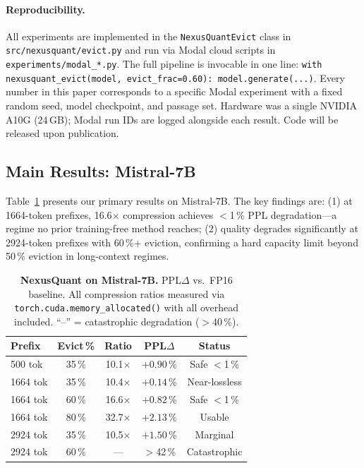 \documentclass{article}
\begin{document}
\paragraph{Reproducibility.}
All experiments are implemented in the \texttt{NexusQuantEvict} class
in \texttt{src/nexusquant/evict.py} and run via Modal cloud scripts in
\texttt{experiments/modal\_*.py}. The full pipeline is invocable in one
line: \texttt{with nexusquant\_evict(model, evict\_frac=0.60): model.generate(...)}.
Every number in this paper corresponds to a specific Modal experiment with
a fixed random seed, model checkpoint, and passage set. Hardware was a
single NVIDIA A10G (24\,GB); Modal run IDs are logged alongside each
result. Code will be released upon publication.

\subsection{Main Results: Mistral-7B}
\label{sec:main_results}

Table~\ref{tab:main_mistral} presents our primary results on Mistral-7B.
The key findings are: (1) at 1664-token prefixes, 16.6$\times$ compression
achieves $<$1\,\% PPL degradation---a regime no prior training-free method
reaches; (2) quality degrades significantly at 2924-token prefixes with
60\,\%+ eviction, confirming a hard capacity limit beyond 50\,\% eviction
in long-context regimes.

\begin{table}[t]
\centering
\caption{\textbf{NexusQuant on Mistral-7B.} PPL$\Delta$ vs.\ FP16 baseline.
  All compression ratios measured via \texttt{torch.cuda.memory\_allocated()}
  with all overhead included. ``--'' = catastrophic degradation ($>$40\,\%).}
\label{tab:main_mistral}
\begin{tabular}{@{}lcccc@{}}
\toprule
Prefix & Evict\,\% & Ratio & PPL$\Delta$ & Status \\
\midrule
500 tok  & 35\,\% & 10.1$\times$ & $+0.90$\,\% & Safe $<$1\,\% \\
1664 tok & 35\,\% & 10.4$\times$ & $+0.14$\,\% & Near-lossless \\
1664 tok & 60\,\% & 16.6$\times$ & $+0.82$\,\% & Safe $<$1\,\% \\
1664 tok & 80\,\% & 32.7$\times$ & $+2.13$\,\% & Usable \\
2924 tok & 35\,\% & 10.5$\times$ & $+1.50$\,\% & Marginal \\
2924 tok & 60\,\% & --- & $>$42\,\%  & Catastrophic \\
\bottomrule
\end{tabular}
\end{table}
\end{document}
